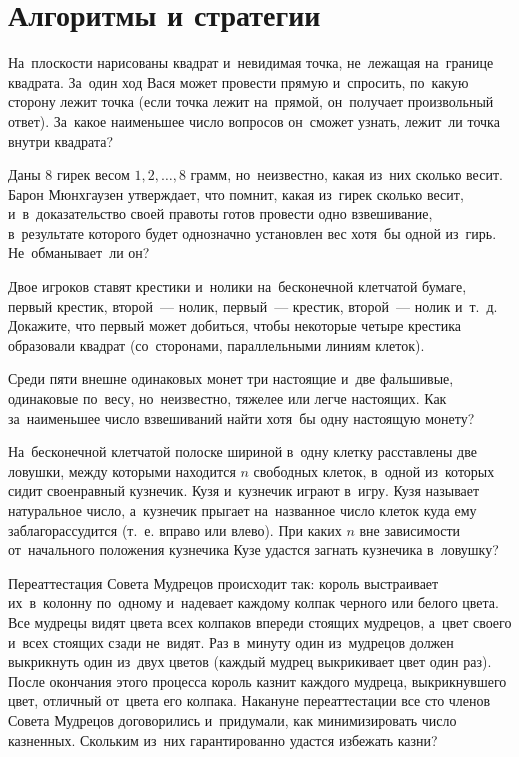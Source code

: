 
\section*{Алгоритмы и стратегии}


\begin{problems}

\item
На~плоскости нарисованы квадрат и~невидимая точка, не~лежащая на~границе
квадрата.
За~один ход Вася может провести прямую и~спросить, по~какую сторону лежит точка
(если точка лежит на~прямой, он~получает произвольный ответ).
За~какое наименьшее число вопросов он~сможет узнать, лежит~ли точка внутри
квадрата?

\item
Даны 8 гирек весом $1, 2, \ldots, 8$ грамм, но~неизвестно, какая из~них
сколько весит.
Барон Мюнхгаузен утверждает, что помнит, какая из~гирек сколько весит,
и~в~доказательство своей правоты готов провести одно взвешивание, в~результате
которого будет однозначно установлен вес хотя~бы одной из~гирь.
Не~обманывает~ли он?

\item
Двое игроков ставят крестики и~нолики на~бесконечной клетчатой бумаге, первый
крестик, второй~--- нолик, первый~--- крестик, второй~--- нолик и~т.~д.
Докажите, что первый может добиться, чтобы некоторые четыре крестика образовали
квадрат (со~сторонами, параллельными линиям клеток).

\item
Среди пяти внешне одинаковых монет три настоящие и~две фальшивые, одинаковые
по~весу, но~неизвестно, тяжелее или легче настоящих.
Как за~наименьшее число взвешиваний найти хотя~бы одну настоящую монету?

\item
На~бесконечной клетчатой полоске шириной в~одну клетку расставлены две ловушки,
между которыми находится $n$ свободных клеток, в~одной из~которых сидит
своенравный кузнечик.
Кузя и~кузнечик играют в~игру.
Кузя называет натуральное число, а~кузнечик прыгает на~названное число клеток
куда ему заблагорассудится (т.~е. вправо или влево).
При каких $n$ вне зависимости от~начального положения кузнечика Кузе удастся
загнать кузнечика в~ловушку?

\item
Переаттестация Совета Мудрецов происходит так: король выстраивает их~в~колонну
по~одному и~надевает каждому колпак черного или белого цвета.
Все мудрецы видят цвета всех колпаков впереди стоящих мудрецов, а~цвет своего
и~всех стоящих сзади не~видят.
Раз в~минуту один из~мудрецов должен выкрикнуть один из~двух цветов (каждый
мудрец выкрикивает цвет один раз).
После окончания этого процесса король казнит каждого мудреца, выкрикнувшего
цвет, отличный от~цвета его колпака.
Накануне переаттестации все сто членов Совета Мудрецов договорились
и~придумали, как минимизировать число казненных.
Скольким из~них гарантированно удастся избежать казни?


\end{problems}
